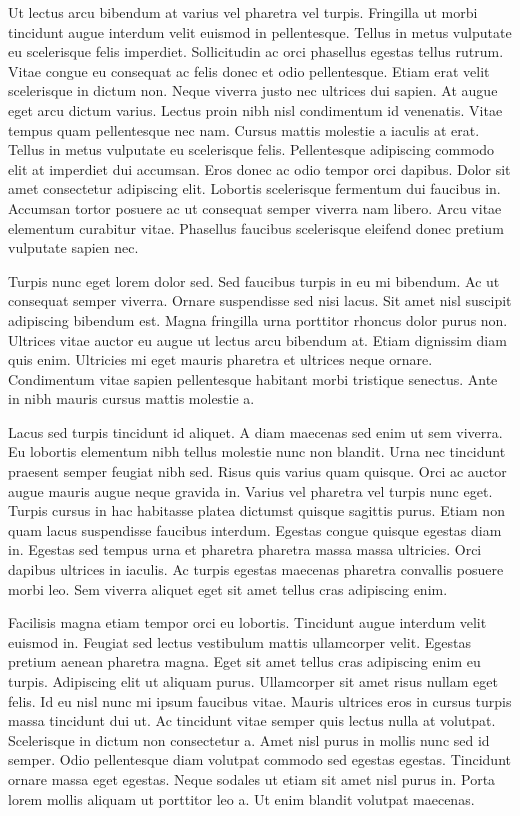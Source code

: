 \documentclass[../main.tex]{subfile}
\begin{document}
Ut lectus arcu bibendum at varius vel pharetra vel turpis. Fringilla ut morbi tincidunt augue interdum velit euismod in pellentesque. Tellus in metus vulputate eu scelerisque felis imperdiet. Sollicitudin ac orci phasellus egestas tellus rutrum. Vitae congue eu consequat ac felis donec et odio pellentesque. Etiam erat velit scelerisque in dictum non. Neque viverra justo nec ultrices dui sapien. At augue eget arcu dictum varius. Lectus proin nibh nisl condimentum id venenatis. Vitae tempus quam pellentesque nec nam. Cursus mattis molestie a iaculis at erat. Tellus in metus vulputate eu scelerisque felis. Pellentesque adipiscing commodo elit at imperdiet dui accumsan. Eros donec ac odio tempor orci dapibus. Dolor sit amet consectetur adipiscing elit. Lobortis scelerisque fermentum dui faucibus in. Accumsan tortor posuere ac ut consequat semper viverra nam libero. Arcu vitae elementum curabitur vitae. Phasellus faucibus scelerisque eleifend donec pretium vulputate sapien nec.

Turpis nunc eget lorem dolor sed. Sed faucibus turpis in eu mi bibendum. Ac ut consequat semper viverra. Ornare suspendisse sed nisi lacus. Sit amet nisl suscipit adipiscing bibendum est. Magna fringilla urna porttitor rhoncus dolor purus non. Ultrices vitae auctor eu augue ut lectus arcu bibendum at. Etiam dignissim diam quis enim. Ultricies mi eget mauris pharetra et ultrices neque ornare. Condimentum vitae sapien pellentesque habitant morbi tristique senectus. Ante in nibh mauris cursus mattis molestie a.

Lacus sed turpis tincidunt id aliquet. A diam maecenas sed enim ut sem viverra. Eu lobortis elementum nibh tellus molestie nunc non blandit. Urna nec tincidunt praesent semper feugiat nibh sed. Risus quis varius quam quisque. Orci ac auctor augue mauris augue neque gravida in. Varius vel pharetra vel turpis nunc eget. Turpis cursus in hac habitasse platea dictumst quisque sagittis purus. Etiam non quam lacus suspendisse faucibus interdum. Egestas congue quisque egestas diam in. Egestas sed tempus urna et pharetra pharetra massa massa ultricies. Orci dapibus ultrices in iaculis. Ac turpis egestas maecenas pharetra convallis posuere morbi leo. Sem viverra aliquet eget sit amet tellus cras adipiscing enim.

Facilisis magna etiam tempor orci eu lobortis. Tincidunt augue interdum velit euismod in. Feugiat sed lectus vestibulum mattis ullamcorper velit. Egestas pretium aenean pharetra magna. Eget sit amet tellus cras adipiscing enim eu turpis. Adipiscing elit ut aliquam purus. Ullamcorper sit amet risus nullam eget felis. Id eu nisl nunc mi ipsum faucibus vitae. Mauris ultrices eros in cursus turpis massa tincidunt dui ut. Ac tincidunt vitae semper quis lectus nulla at volutpat. Scelerisque in dictum non consectetur a. Amet nisl purus in mollis nunc sed id semper. Odio pellentesque diam volutpat commodo sed egestas egestas. Tincidunt ornare massa eget egestas. Neque sodales ut etiam sit amet nisl purus in. Porta lorem mollis aliquam ut porttitor leo a. Ut enim blandit volutpat maecenas.
\end{document}
